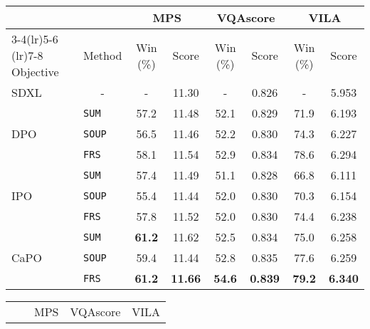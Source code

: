 \begin{table*}[t]
\centering
\small
\centering\small
{}
\setlength\tabcolsep{1.5pt} 
\begin{minipage}{0.49\textwidth}
\centering\small
\begin{tabular}{ll  cc cc cc  }
\toprule
&& \multicolumn{2}{c}{MPS}  & \multicolumn{2}{c}{VQAscore}  & \multicolumn{2}{c}{VILA} \\
\cmidrule(lr){3-4}\cmidrule(lr){5-6} \cmidrule(lr){7-8}
Objective & Method  & Win (\%) & Score & Win (\%) & Score & Win (\%) & Score\\
\midrule
SDXL & \multicolumn{1}{c}{-} & - & 11.30 & - & 0.826 & - &5.953 \\
\midrule
\multirow{3}{*}{DPO} 
& {\tt{SUM}}  & 57.2 & 11.48 & 52.1 & 0.829 & 71.9 & 6.193  \\
& {\tt{SOUP}} & 56.5 & 11.46 & 52.2 & 0.830 & 74.3 & 6.227 \\
& {\tt{FRS}}  & 58.1 & 11.54 & 52.9 & 0.834 & 78.6 & 6.294 \\
\midrule
\multirow{3}{*}{IPO} 
& {\tt{SUM}}  & 57.4 & 11.49 & 51.1 & 0.828 & 66.8 & 6.111  \\
& {\tt{SOUP}} & 55.4 & 11.44 & 52.0 & 0.830 & 70.3 & 6.154  \\
& {\tt{FRS}}  & 57.8 & 11.52 & 52.0 & 0.830 & 74.4 & 6.238  \\
\midrule
\multirow{3}{*}{CaPO} 
& {\tt{SUM}}  & {\bf 61.2} & 11.62 & 52.5 & 0.834 & 75.0 & 6.258 \\
& {\tt{SOUP}} & 59.4 & 11.44 & 52.8 & 0.835 & 77.6 & 6.259 \\
& {\tt{FRS}}  & {\bf 61.2} & {\bf 11.66} & {\bf 54.6} & {\bf 0.839} & {\bf 79.2} & {\bf 6.340} \\
\bottomrule
\end{tabular}
\caption*{(a) Base model SDXL}
\end{minipage}
\begin{minipage}{0.49\textwidth}
\centering\small
\hfill
\begin{tabular}{ll  cc cc cc  }
\toprule
&& \multicolumn{2}{c}{MPS}  & \multicolumn{2}{c}{VQAscore}  & \multicolumn{2}{c}{VILA} \\

\end{tabular}
\end{minipage}
\end{table*}
